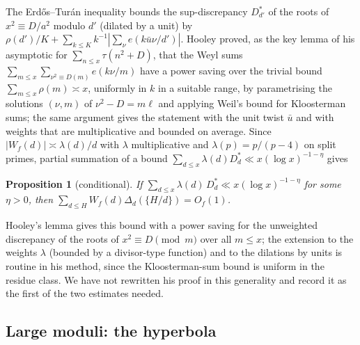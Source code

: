 \documentclass[11pt,a4paper]{article}
\newtheorem{proposition}[theorem]{Proposition}
\begin{document}
The Erd\H os--Tur\'an inequality bounds the sup-discrepancy $D^\ast_{d'}$ of the roots of $x^2\equiv D/a^2$
modulo $d'$ (dilated by a unit) by $\rho(d')/K+\sum_{k\le K}k^{-1}|\sum_\nu e(k\bar u\nu/d')|$. Hooley
\cite{Hooley1963} proved, as the key lemma of his asymptotic for $\sum_{n\le x}\tau(n^2+D)$, that the Weyl
sums $\sum_{m\le x}\sum_{\nu^2\equiv D(m)}e(k\nu/m)$ have a power saving over the trivial bound
$\sum_{m\le x}\rho(m)\asymp x$, uniformly in $k$ in a suitable range, by parametrising the solutions
$(\nu,m)$ of $\nu^2-D=m\ell$ and applying Weil's bound for Kloosterman sums; the same argument gives the
statement with the unit twist $\bar u$ and with weights that are multiplicative and bounded on average.
Since $|W_f(d)|\asymp\lambda(d)/d$ with $\lambda$ multiplicative and $\lambda(p)=p/(p-4)$ on split primes,
partial summation of a bound $\sum_{d\le x}\lambda(d)D^\ast_d\ll x(\log x)^{-1-\eta}$ gives

\begin{proposition}[conditional]\label{prop:A2}
If $\sum_{d\le x}\lambda(d)\,D^\ast_d\ll x(\log x)^{-1-\eta}$ for some $\eta>0$, then
$\sum_{d\le H}W_f(d)\Delta_d(\{H/d\})=O_f(1)$.
\end{proposition}

Hooley's lemma gives this bound with a power saving for the unweighted discrepancy of the roots of
$x^2\equiv D\pmod m$ over all $m\le x$; the extension to the weights $\lambda$ (bounded by a divisor-type
function) and to the dilations by units is routine in his method, since the Kloosterman-sum bound is
uniform in the residue class. We have not rewritten his proof in this generality and record it as the
first of the two estimates needed.

\subsection{Large moduli: the hyperbola}
\end{document}
